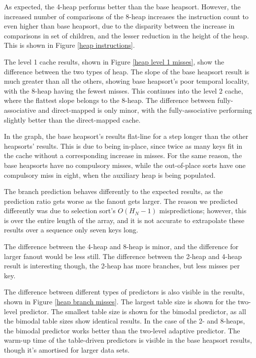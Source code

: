 
As expected, the 4-heap performs better than the base heapsort. However, the
increased number of comparisons of the 8-heap increases the instruction count to
even higher than base heapsort, due to the disparity between the increase in
comparisons in set of children, and the lesser reduction in the height of the
heap. This is shown in Figure \ref{heap instructions}.

The level 1 cache results, shown in Figure \ref{heap level 1 misses}, show the
difference between the two types of heap. The slope of the base heapsort result
is much greater than all the others, showing base heapsort's poor temporal
locality, with the 8-heap having the fewest misses. This continues into the
level 2 cache, where the flattest slope belongs to the 8-heap. The difference
between fully-associative and direct-mapped is only minor, with the
fully-associative performing slightly better than the direct-mapped cache.

In the graph, the base heapsort's results flat-line for a step longer than the
other heapsorts' results. This is due to being in-place, since twice as many
keys fit in the cache without a corresponding increase in misses. For the same
reason, the base heapsorts have no compulsory misses, while the out-of-place
sorts have one compulsory miss in eight, when the auxiliary heap is being
populated.

The branch prediction behaves differently to the expected results, as the
prediction ratio gets worse as the fanout gets larger. The reason we predicted
differently was due to selection sort's $O(H_N-1)$ mispredictions; however, this
is over the entire length of the array, and it is not accurate to extrapolate
these results over a sequence only seven keys long.

The difference between the 4-heap and 8-heap is minor, and the difference for
larger fanout would be less still. The difference between the 2-heap and 4-heap
result is interesting though, the 2-heap has more branches, but less misses per
key.

The difference between different types of predictors is also visible in the
results, shown in Figure \ref{heap branch misses}. The largest table size is
shown for the two-level predictor. The smallest table size is shown for the
bimodal predictor, as all the bimodal table sizes show identical results. In the
case of the 2- and 8-heaps, the bimodal predictor works better than the
two-level adaptive predictor. The warm-up time of the table-driven predictors is
visible in the base heapsort results, though it's amortised for larger data
sets.

